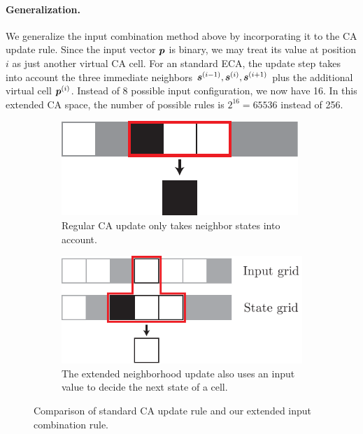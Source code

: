 \paragraph{Generalization.} We generalize the input combination method above by
incorporating it to the \ac{CA} update rule. Since the input vector ${\bm{p}}$ is
binary, we may treat its value at position $i$ as just another virtual \ac{CA}
cell. For an standard \ac{ECA}, the update step takes into account the three
immediate neighbors ${\bm{s}}^{(i - 1)}, {\bm{s}}^{(i)}, {\bm{s}}^{(i + 1)}$ plus the additional
virtual cell ${\bm{p}}^{(i)}$. Instead of 8 possible input configuration, we now have
16. In this extended \ac{CA} space, the number of possible rules is
$2^{16} = 65536$ instead of 256.

\begin{figure}[htbp]
  \centering
    \begin{subfigure}[b]{.387\linewidth}
    \centering
    \includegraphics[width=\linewidth]{figures/ca_update_rule.pdf}
    \caption{Regular CA update only takes neighbor states into
      account.}\label{fig:standard-ca-update}
  \end{subfigure}
  \hspace{10pt}
  \begin{subfigure}[b]{.55\linewidth}
    \centering
    \includegraphics[width=\linewidth]{figures/generalized_ca_update_rule.pdf}
    \caption{The extended neighborhood update also uses an input value to
      decide the next state of a cell.}\label{fig:generalized-ca-update}
  \end{subfigure}
  \caption{Comparison of standard CA update rule and our extended input
    combination rule.\label{fig:ca_update_rule}}
\end{figure}

